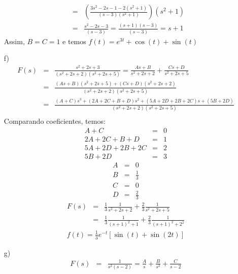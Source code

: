 \begin{resp}
\begin{itemize}
\begin{eqnarray*}
&=&\left(\frac{3s^2-2s-1-2(s^2+1)}{(s-3)(s^2+1)}\right)(s^2+1)\\
&=&\frac{s^2-2s-3}{(s-3)}=\frac{(s+1)(s-3)}{(s-3)}=s+1
\end{eqnarray*}
Assim, $B=C=1$ e temos
$f(t)=e^{3t}+\cos(t)+\sin(t)$
 \item [f)]
\begin{eqnarray*}
F(s)&=&\frac{s^2+2s+3}{(s^2+2s+2)(s^2+2s+5)}=\frac{As+B}{s^2+2s+2}+\frac{Cs+D}{s^2+2s+5}\\
&=&\frac{(As+B)(s^2+2s+5)+(Cs+D)(s^2+2s+2)}{(s^2+2s+2)(s^2+2s+5)}\\
&=&\frac{(A+C)s^3+(2A+2C+B+D)s^2+(5A+2D+2B+2C)s+(5B+2D)}{(s^2+2s+2)(s^2+2s+5)}\\
\end{eqnarray*}
Comparando coeficientes, temos:
\begin{eqnarray*}
A+C&=&0\\
2A+2C+B+D&=&1\\
5A+2D+2B+2C&=&2\\
5B+2D&=&3
\end{eqnarray*}
\begin{eqnarray*}
A&=&0  \\
B&=&\frac{1}{3}  \\
C&=& 0 \\
D&=&\frac{2}{3}
\end{eqnarray*}
\begin{eqnarray*}
F(s)&=&\frac{1}{3}\frac{1}{s^2+2s+2}+\frac{2}{3}\frac{1}{s^2+2s+5}\\
&=&\frac{1}{3}\frac{1}{(s+1)^2+1}+\frac{2}{3}\frac{1}{(s+1)^2+2^2}
\end{eqnarray*}
\begin{eqnarray*}
f(t)=\frac{1}{3}e^{-t}\left[\sin(t)+\sin(2t)\right]
\end{eqnarray*}
 \item [g)]
\begin{eqnarray*}
F(s)&=&\frac{1}{s^2(s-2)}=\frac{A}{s}+\frac{B}{s^2}+\frac{C}{s-2}
\end{eqnarray*}
\end{itemize}
\end{resp}

